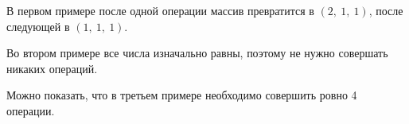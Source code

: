 В первом примере после одной операции массив превратится в $(2,\ 1,\ 1)$, после следующей в $(1,\ 1,\ 1)$.

Во втором примере все числа изначально равны, поэтому не нужно совершать никаких операций.

Можно показать, что в третьем примере необходимо совершить ровно 4 операции.
